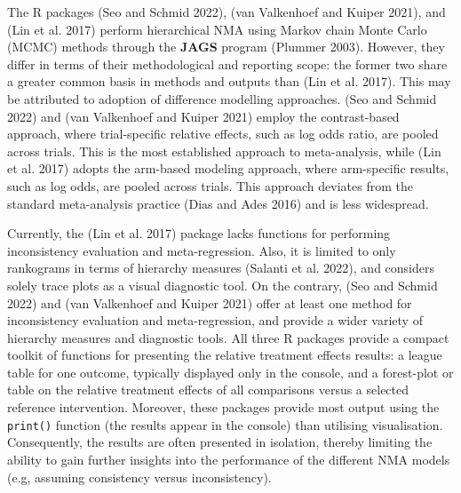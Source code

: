 The R packages  (Seo and Schmid 2022),  (van Valkenhoef and Kuiper 2021), and 
(Lin et al. 2017) perform hierarchical NMA using Markov chain Monte Carlo (MCMC) methods
through the \textbf{JAGS} program (Plummer 2003). However, they differ in terms of their
methodological and reporting scope: the former two share a greater common basis in methods and outputs
than  (Lin et al. 2017). This may be attributed to adoption of difference modelling approaches.
 (Seo and Schmid 2022) and  (van Valkenhoef and Kuiper 2021) employ the contrast-based approach, where
trial-specific relative effects, such as log odds ratio, are
pooled across trials. This is the most established approach to meta-analysis, while
 (Lin et al. 2017) adopts the arm-based modeling approach, where
arm-specific results, such as log odds, are pooled across trials. This approach
deviates from the standard meta-analysis practice (Dias and Ades 2016) and is less widespread.

Currently, the  (Lin et al. 2017) package lacks functions for performing inconsistency evaluation
and meta-regression. Also, it is limited to only rankograms in terms of hierarchy
measures (Salanti et al. 2022), and considers solely trace plots as a visual diagnostic tool.
On the contrary,  (Seo and Schmid 2022) and  (van Valkenhoef and Kuiper 2021) offer at least
one method for inconsistency evaluation and meta-regression, and provide a wider variety of hierarchy measures
and diagnostic tools. All three R packages provide a compact toolkit
of functions for presenting the relative treatment effects results: a league
table for one outcome, typically displayed only in the console, and a forest-plot or table
on the relative treatment effects of all comparisons versus a selected reference intervention.
Moreover, these packages provide most output using the \texttt{print()} function (the results appear in the
console) than utilising visualisation. Consequently, the results are often presented in isolation, thereby limiting
the ability to gain further insights into the performance of the different NMA models
(e.g, assuming consistency versus inconsistency).

